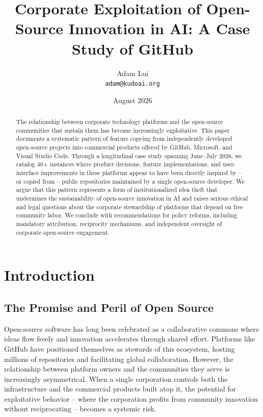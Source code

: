 \documentclass[12pt]{article}
\title{Corporate Exploitation of Open-Source Innovation in AI: A Case Study of GitHub}
\author{Adam Lui \\ \texttt{adam@kudoai.org}}
\date{August 2026}
\begin{document}
\maketitle

\begin{abstract}
The relationship between corporate technology platforms and the open-source communities that sustain them has become increasingly exploitative. This paper documents a systematic pattern of feature copying from independently developed open-source projects into commercial products offered by GitHub, Microsoft, and Visual Studio Code. Through a longitudinal case study spanning June--July 2026, we catalog 40+ instances where product decisions, feature implementations, and user-interface improvements in these platforms appear to have been directly inspired by -- or copied from -- public repositories maintained by a single open-source developer. We argue that this pattern represents a form of institutionalized idea theft that undermines the sustainability of open-source innovation in AI and raises serious ethical and legal questions about the corporate stewardship of platforms that depend on free community labor. We conclude with recommendations for policy reforms, including mandatory attribution, reciprocity mechanisms, and independent oversight of corporate open-source engagement.
\end{abstract}

\section{Introduction}

\subsection{The Promise and Peril of Open Source}
Open-source software has long been celebrated as a collaborative commons where ideas flow freely and innovation accelerates through shared effort. Platforms like GitHub have positioned themselves as stewards of this ecosystem, hosting millions of repositories and facilitating global collaboration. However, the relationship between platform owners and the communities they serve is increasingly asymmetrical. When a single corporation controls both the infrastructure and the commercial products built atop it, the potential for exploitative behavior -- where the corporation profits from community innovation without reciprocating -- becomes a systemic risk.
\end{document}
